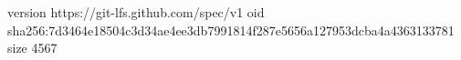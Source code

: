 version https://git-lfs.github.com/spec/v1
oid sha256:7d3464e18504c3d34ae4ee3db7991814f287e5656a127953dcba4a4363133781
size 4567
